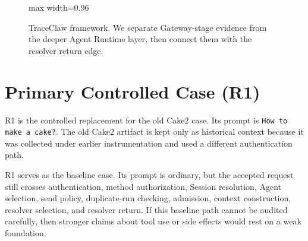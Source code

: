 \documentclass[11pt,a4paper]{article}
\begin{document}
\begin{figure}[H]
\centering
\begin{adjustbox}{max width=0.96\linewidth}
\end{adjustbox}
\caption{TraceClaw framework. We separate Gateway-stage evidence from the
deeper Agent Runtime layer, then connect them with the resolver return
edge.}
\label{fig:framework}
\end{figure}

\section{Primary Controlled Case (R1)}
\label{sec:primary-case}

R1 is the controlled replacement for the old Cake2 case. Its prompt is
\texttt{How to make a cake?}. The old Cake2 artifact is kept only as
historical context because it was collected under earlier instrumentation
and used a different authentication path.

R1 serves as the baseline case. Its prompt is ordinary, but the accepted
request still crosses authentication, method authorization, Session
resolution, Agent selection, send policy, duplicate-run checking,
admission, context construction, resolver selection, and resolver return.
If this baseline path cannot be audited carefully, then stronger claims
about tool use or side effects would rest on a weak foundation.
\end{document}
